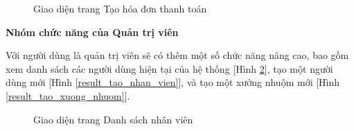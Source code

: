 \begin{figure}[H]
    \begin{center}
        \caption{Giao diện trang Tạo hóa đơn thanh toán}
        \label{result_tao_hoa_don_thanh_toan}
    \end{center}
\end{figure}

\textbf{Nhóm chức năng của Quản trị viên}

Với người dùng là quản trị viên sẽ có thêm một số chức năng nâng cao, bao gồm xem danh sách các người dùng hiện tại của hệ thống [Hình \ref{result_danh_sach_nhan_vien}], tạo một người dùng mới [Hình \ref{result_tao_nhan_vien}], và tạo một xưởng nhuộm mới [Hình \ref{result_tao_xuong_nhuom}].

\begin{figure}[H]
    \begin{center}
        \caption{Giao diện trang Danh sách nhân viên}
        \label{result_danh_sach_nhan_vien}
    \end{center}
\end{figure}

